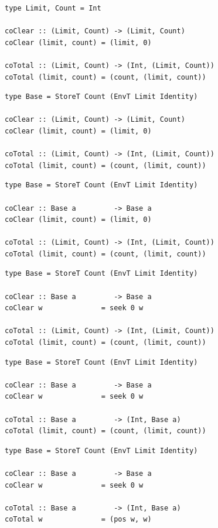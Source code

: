 \documentclass{beamer}
\begin{document}
\begin{frame}[fragile]
  \begin{overprint}
  \begin{verbatim}
type Limit, Count = Int

coClear :: (Limit, Count) -> (Limit, Count)
coClear (limit, count) = (limit, 0)

coTotal :: (Limit, Count) -> (Int, (Limit, Count))
coTotal (limit, count) = (count, (limit, count))
  \end{verbatim}
  \begin{verbatim}
type Base = StoreT Count (EnvT Limit Identity)

coClear :: (Limit, Count) -> (Limit, Count)
coClear (limit, count) = (limit, 0)

coTotal :: (Limit, Count) -> (Int, (Limit, Count))
coTotal (limit, count) = (count, (limit, count))
  \end{verbatim}
  \begin{verbatim}
type Base = StoreT Count (EnvT Limit Identity)

coClear :: Base a         -> Base a
coClear (limit, count) = (limit, 0)

coTotal :: (Limit, Count) -> (Int, (Limit, Count))
coTotal (limit, count) = (count, (limit, count))
  \end{verbatim}
  \begin{verbatim}
type Base = StoreT Count (EnvT Limit Identity)

coClear :: Base a         -> Base a
coClear w              = seek 0 w

coTotal :: (Limit, Count) -> (Int, (Limit, Count))
coTotal (limit, count) = (count, (limit, count))
  \end{verbatim}
  \begin{verbatim}
type Base = StoreT Count (EnvT Limit Identity)

coClear :: Base a         -> Base a
coClear w              = seek 0 w

coTotal :: Base a         -> (Int, Base a)
coTotal (limit, count) = (count, (limit, count))
  \end{verbatim}
  \begin{verbatim}
type Base = StoreT Count (EnvT Limit Identity)

coClear :: Base a         -> Base a
coClear w              = seek 0 w

coTotal :: Base a         -> (Int, Base a)
coTotal w              = (pos w, w)
  \end{verbatim}

  \end{overprint}
\end{frame}
\end{document}
